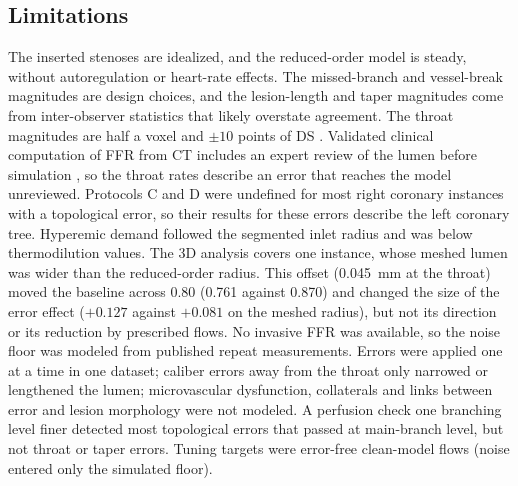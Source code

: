 \documentclass[journal,twoside,web]{ieeecolor}
\begin{document}
\subsection{Limitations}
The inserted stenoses are idealized, and the reduced-order model is steady, without autoregulation or heart-rate
effects. The missed-branch and vessel-break magnitudes are design choices, and the lesion-length and taper magnitudes come from
inter-observer statistics that likely overstate agreement. The throat magnitudes are half a voxel and $\pm 10$ points of DS \cite{boogers2010,gouya2009}. Validated clinical computation of FFR from CT includes an expert review of the lumen before simulation \cite{norgaard2014}, so the throat rates describe an error that reaches the model unreviewed. Protocols C and D were undefined for most right coronary
instances with a topological error, so their results for these errors describe the left coronary tree. Hyperemic
demand followed the segmented inlet radius and was below thermodilution values. The 3D analysis covers one instance, whose meshed lumen was wider than the reduced-order radius. This offset (0.045~mm at the throat) moved the baseline across 0.80 (0.761 against 0.870) and changed the size of the error effect ($+0.127$ against $+0.081$ on the meshed radius), but not its direction or its reduction by prescribed flows. No invasive FFR was available, so the noise floor was modeled from published repeat
measurements. Errors were applied one at a time in one dataset; caliber errors away from the throat only narrowed or lengthened the lumen; microvascular
dysfunction, collaterals and links between error and lesion morphology were not modeled. A perfusion check one
branching level finer detected most topological errors that passed at main-branch level, but not throat or taper
errors. Tuning targets were error-free clean-model flows
(noise entered only the simulated floor).
\end{document}

